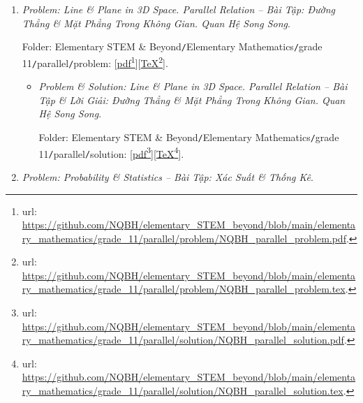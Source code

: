 \documentclass[12pt]{article}
\begin{document}
\begin{enumerate}
\begin{itemize}
		Folder: {\sf Elementary STEM \& Beyond{\tt/}Elementary Mathematics{\tt/}grade 11{\tt/}limit{\tt/}solution}: [\href{https://github.com/NQBH/elementary_STEM_beyond/blob/main/elementary_mathematics/grade_11/limit/solution/NQBH_limit_solution.pdf}{pdf}\footnote{{\sc url}: \url{https://github.com/NQBH/elementary_STEM_beyond/blob/main/elementary_mathematics/grade_11/limit/solution/NQBH_limit_solution.pdf}.}][\href{https://github.com/NQBH/elementary_STEM_beyond/blob/main/elementary_mathematics/grade_11/limit/solution/NQBH_limit_solution.tex}{\TeX}\footnote{{\sc url}: \url{https://github.com/NQBH/elementary_STEM_beyond/blob/main/elementary_mathematics/grade_11/limit/solution/NQBH_limit_solution.tex}.}].
	\end{itemize}
	\item {\it Problem: Line \& Plane in 3D Space. Parallel Relation -- Bài Tập: Đường Thẳng \& Mặt Phẳng Trong Không Gian. Quan Hệ Song Song}.
	
	Folder: {\sf Elementary STEM \& Beyond{\tt/}Elementary Mathematics{\tt/}grade 11{\tt/}parallel{\tt/}problem}: [\href{https://github.com/NQBH/elementary_STEM_beyond/blob/main/elementary_mathematics/grade_11/parallel/problem/NQBH_parallel_problem.pdf}{pdf}\footnote{{\sc url}: \url{https://github.com/NQBH/elementary_STEM_beyond/blob/main/elementary_mathematics/grade_11/parallel/problem/NQBH_parallel_problem.pdf}.}][\href{https://github.com/NQBH/elementary_STEM_beyond/blob/main/elementary_mathematics/grade_11/parallel/problem/NQBH_parallel_problem.tex}{\TeX}\footnote{{\sc url}: \url{https://github.com/NQBH/elementary_STEM_beyond/blob/main/elementary_mathematics/grade_11/parallel/problem/NQBH_parallel_problem.tex}.}].
	\begin{itemize}
		\item {\it Problem \& Solution: Line \& Plane in 3D Space. Parallel Relation -- Bài Tập \& Lời Giải: Đường Thẳng \& Mặt Phẳng Trong Không Gian. Quan Hệ Song Song}.
		
		Folder: {\sf Elementary STEM \& Beyond{\tt/}Elementary Mathematics{\tt/}grade 11{\tt/}parallel{\tt/}solution}: [\href{https://github.com/NQBH/elementary_STEM_beyond/blob/main/elementary_mathematics/grade_11/parallel/solution/NQBH_parallel_solution.pdf}{pdf}\footnote{{\sc url}: \url{https://github.com/NQBH/elementary_STEM_beyond/blob/main/elementary_mathematics/grade_11/parallel/solution/NQBH_parallel_solution.pdf}.}][\href{https://github.com/NQBH/elementary_STEM_beyond/blob/main/elementary_mathematics/grade_11/parallel/solution/NQBH_parallel_solution.tex}{\TeX}\footnote{{\sc url}: \url{https://github.com/NQBH/elementary_STEM_beyond/blob/main/elementary_mathematics/grade_11/parallel/solution/NQBH_parallel_solution.tex}.}].
	\end{itemize}
	\item {\it Problem: Probability \& Statistics -- Bài Tập: Xác Suất \& Thống Kê}.
	

\end{enumerate}
\end{document}
